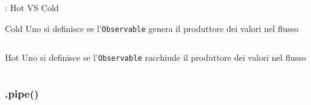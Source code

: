             \begin{frame}{\insertsubsectionhead}{\insertsubsubsectionhead: Hot VS Cold}


                \begin{block}{Cold}
                    Uno  si definisce \textbf{} se l'\texttt{Observable} genera il produttore dei valori nel flusso
                \end{block}
                \inputminted{js}{src/cold_observable.js}

                \pause

                \begin{block}{Hot}
                    Uno  si definisce \textbf{} se l'\texttt{Observable} racchiude il produttore dei valori nel flusso
                \end{block}
                \inputminted{js}{src/hot_observable.js}

            \end{frame}

            \subsubsection{.pipe()}\label{subsub:pipe}

